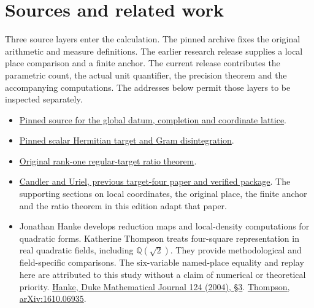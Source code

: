 \documentclass[12pt,letterpaper]{article}
\begin{document}
\clearpage\section*{Sources and related work}
Three source layers enter the calculation. The pinned archive fixes the original arithmetic and measure definitions. The earlier research release supplies a local place comparison and a finite anchor. The current release contributes the parametric count, the actual unit quantifier, the precision theorem and the accompanying computations. The addresses below permit those layers to be inspected separately.
\begin{itemize}
\item \href{https://github.com/nousentllc/riemann-hypothesis/blob/40e56bab026552e089d7afcfeff08d2defb9c005/src/Formalism/SharpRestriction/GlobalSchurBounds/GeneralLinearActions/GenusMassVolumes.lean}{Pinned source for the global datum, completion and coordinate lattice}.
\item \href{https://github.com/nousentllc/riemann-hypothesis/blob/40e56bab026552e089d7afcfeff08d2defb9c005/src/CompanionTheory/SpectralGeometry/CountingDefinitions/AdelicEulerProducts/IsEulerProd.lean}{Pinned scalar Hermitian target and Gram disintegration}.
\item \href{https://github.com/nousentllc/riemann-hypothesis/blob/40e56bab026552e089d7afcfeff08d2defb9c005/src/CompanionTheory/SpectralGeometry/LocalGlobalProofs/AdelicAnalysis/LocalGramFiberRankOneSetFormula.lean#L310}{Original rank-one regular-target ratio theorem}.
\item \href{https://github.com/nousentllc/riemann-hypothesis/tree/63c06fe44eb700e4550e4a2b70adafe09cb1ff9b/research/uriel/experiments/ramified-gram-bridge}{Candler and Uriel, previous target-four paper and verified package}. The supporting sections on local coordinates, the original place, the finite anchor and the ratio theorem in this edition adapt that paper.
\item Jonathan Hanke develops reduction maps and local-density computations for quadratic forms. Katherine Thompson treats four-square representation in real quadratic fields, including $\mathbb Q(\sqrt2)$. They provide methodological and field-specific comparisons. The six-variable named-place equality and replay here are attributed to this study without a claim of numerical or theoretical priority. \href{https://www.jonhanke.com/Hanke--all_papers__as_of_2015-01-14/explicit-bounds-paper.pdf}{Hanke, Duke Mathematical Journal 124 (2004), §3}. \href{https://arxiv.org/abs/1610.06935}{Thompson, arXiv:1610.06935}.

\end{itemize}
\end{document}

